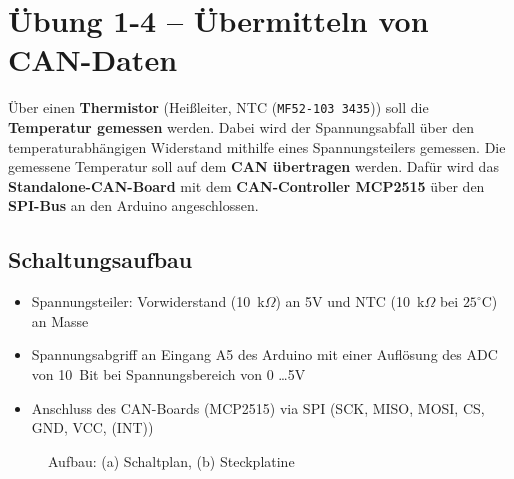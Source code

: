 \documentclass[
    fontsize=12pt,                      %
    paper=a4,                           %
    twoside=off,                       %
    DIV=15,                             %
    BCOR=12mm,                          %
    headings=normal,                    %
    headsepline=false,                   %
    footsepline=false,                  %
    headinclude=true,                   %
    footinclude=false,                  %
    toc=listof,                         %
    toc=bib,                            %
    chapterprefix=false,                %
    appendixprefix=false,               %
    numbers=noendperiod,                %
    captions=tableabove,                %
    footnotes=multiple,                 %
    bibliography=oldstyle,              %
    draft=false,                        %
]{scrreprt}
\begin{document}
\chapter*{Übung 1-4 -- Übermitteln von CAN-Daten}

Über einen \textbf{Thermistor} (Heißleiter, NTC (\texttt{MF52-103 3435})) soll die \textbf{Temperatur gemessen} werden. Dabei wird der Spannungsabfall über den temperaturabhängigen Widerstand mithilfe eines Spannungsteilers gemessen.
\vskip 0.2cm
\noindent
Die gemessene Temperatur soll auf dem \textbf{CAN übertragen} werden. Dafür wird das \textbf{Standalone-CAN-Board} mit dem \textbf{CAN-Controller MCP2515} über den \textbf{SPI-Bus} an den Arduino angeschlossen.

\vskip 0.5cm
\section*{Schaltungsaufbau} 
\begin{itemize}
\item Spannungsteiler: Vorwiderstand (10~k$\Omega$) an 5V und NTC (10~k$\Omega$ bei $25^\circ$C) an Masse
\item Spannungsabgriff an Eingang A5 des Arduino mit einer Auflösung des ADC von 10~Bit bei Spannungsbereich von 0 \dots 5V
\item Anschluss des CAN-Boards (MCP2515) via SPI (SCK, MISO, MOSI, CS, GND, VCC, (INT))
\end{itemize}

\begin{figure}[H]
  \centering
  \quad
  \caption{Aufbau: (a) Schaltplan, (b) Steckplatine}%
\end{figure}
\end{document}
